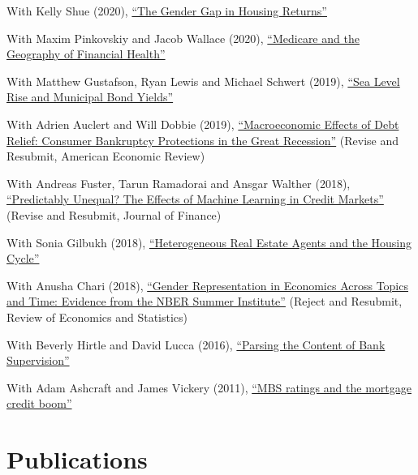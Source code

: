 \documentclass[letterpaper]{article}
\renewenvironment{itemize}{
  \begin{list}{}
    { \setlength{\itemsep}{5pt}
      \setlength{\parsep}{0pt}
      \setlength{\topsep}{0pt}
      \setlength{\leftmargin}{0em} } }{
  \end{list}}
\begin{document}
\begin{itemize}
\item With Kelly Shue (2020), \href{https://paulgp.github.io/papers/Gender_Gap_in_Housing_Returns.pdf}{``The Gender Gap in Housing Returns''}
\item With Maxim Pinkovskiy and Jacob Wallace (2020), \href{http://paulgp.github.io/papers/GPW_compressed.pdf}{``Medicare and the Geography of Financial Health''}
\item With Matthew Gustafson, Ryan Lewis and Michael Schwert (2019), \href{http://paulgp.github.io/papers/ggls_munis_5_08.pdf}{``Sea Level Rise and Municipal Bond Yields''}
\item With Adrien Auclert and Will Dobbie (2019), \href{http://paulgp.github.io/papers/Macroeconomic_Effects_of_Debt_Relief_Posting_342019.pdf}{``Macroeconomic Effects of Debt Relief: Consumer Bankruptcy Protections in the Great Recession''} (Revise and Resubmit, American Economic Review)
\item With Andreas Fuster, Tarun Ramadorai and Ansgar Walther (2018), \href{https://papers.ssrn.com/sol3/papers.cfm?abstract_id=3072038}{``Predictably Unequal? The Effects of Machine Learning in Credit Markets''} (Revise and Resubmit, Journal of Finance)
\item With Sonia Gilbukh (2018), \href{http://paulgp.github.io/papers/Heterogeneous_Real_Estate_Agents_and_the_Housing_Cycle.pdf}{``Heterogeneous Real Estate Agents and the Housing Cycle''}
\item With Anusha Chari (2018), \href{http://paulgp.github.io/papers/cgp_nbergender.pdf}{``Gender Representation in Economics Across Topics and Time: Evidence from the NBER Summer Institute''} (Reject and Resubmit, Review of Economics and Statistics)
\item With Beverly Hirtle and David Lucca (2016), \href{https://www.newyorkfed.org/research/staff_reports/sr770.html}{``Parsing the Content of Bank Supervision''}
\item With Adam Ashcraft and James Vickery (2011), \href{http://papers.ssrn.com/sol3/papers.cfm?abstract_id=1615613}{``MBS ratings and the mortgage credit boom''}
\end{itemize}

\section*{Publications}
\end{document}
